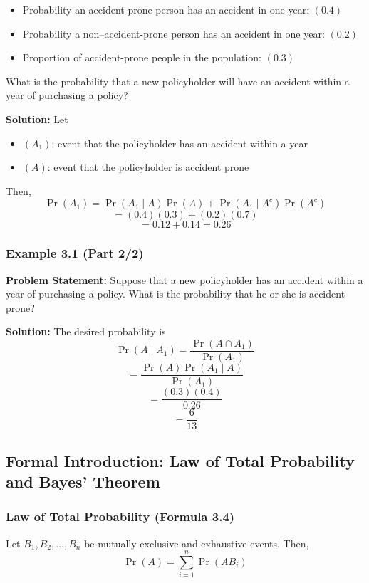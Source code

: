 \documentclass[12pt]{article}
\begin{document}
\begin{itemize}
    \item Probability an accident-prone person has an accident in one year: $( 0.4 )$
    \item Probability a non–accident-prone person has an accident in one year: $( 0.2 )$
    \item Proportion of accident-prone people in the population: $( 0.3 )$
\end{itemize}

What is the probability that a new policyholder will have an accident within a year of purchasing a policy?

\textbf{Solution:}  
Let
\begin{itemize}
    \item $( A_1 )$: event that the policyholder has an accident within a year
    \item $( A )$: event that the policyholder is accident prone
\end{itemize}

Then,
\[
\Pr(A_1) = \Pr(A_1 \mid A)\Pr(A) + \Pr(A_1 \mid A^c)\Pr(A^c)
\]
\[
= (0.4)(0.3) + (0.2)(0.7)
\]
\[
= 0.12 + 0.14 = 0.26
\]

\subsubsection{Example 3.1 (Part 2/2)}

\textbf{Problem Statement:}  
Suppose that a new policyholder has an accident within a year of purchasing a policy. What is the probability that he or she is accident prone?

\textbf{Solution:}  
The desired probability is
\[
\Pr(A \mid A_1) = \frac{\Pr(A \cap A_1)}{\Pr(A_1)}
\]
\[
= \frac{\Pr(A)\Pr(A_1 \mid A)}{\Pr(A_1)}
\]
\[
= \frac{(0.3)(0.4)}{0.26}
\]
\[
= \frac{6}{13}
\]

\subsection{Formal Introduction: Law of Total Probability and Bayes’ Theorem}

\subsubsection{Law of Total Probability (Formula 3.4)}

Let $B_1, B_2, \dots, B_n$ be mutually exclusive and exhaustive events. Then,
\[
\Pr(A) = \sum_{i=1}^{n} \Pr(AB_i)
\]
\end{document}
